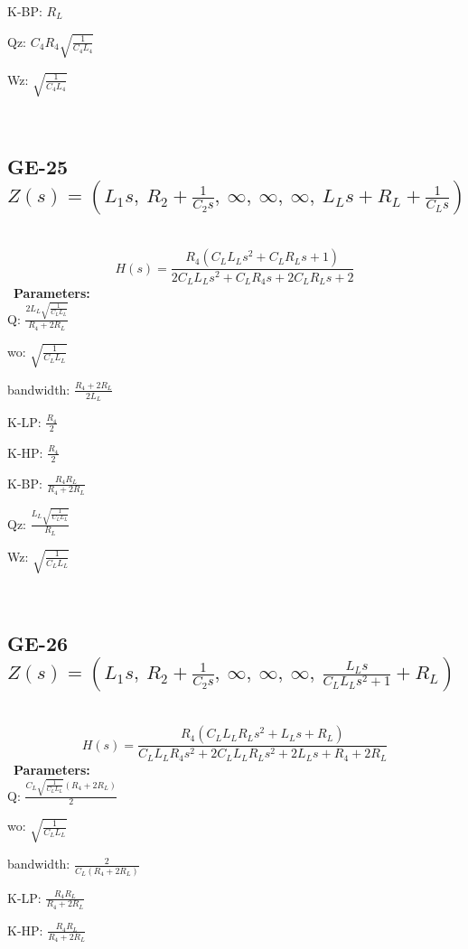 \documentclass{article}
\begin{document}
K-BP: $R_{L}$\ 

Qz: $C_{4} R_{4} \sqrt{\frac{1}{C_{4} L_{4}}}$\ 

Wz: $\sqrt{\frac{1}{C_{4} L_{4}}}$\ 

\ 

\subsection{GE-25 $Z(s) = \left( L_{1} s, \  R_{2} + \frac{1}{C_{2} s}, \  \infty, \  \infty, \  \infty, \  L_{L} s + R_{L} + \frac{1}{C_{L} s}\right)$ } \ 
\textbf{\[H(s) = \frac{R_{4} \left(C_{L} L_{L} s^{2} + C_{L} R_{L} s + 1\right)}{2 C_{L} L_{L} s^{2} + C_{L} R_{4} s + 2 C_{L} R_{L} s + 2}\] } \ 
\textbf{Parameters:}\\ 

Q: $\frac{2 L_{L} \sqrt{\frac{1}{C_{L} L_{L}}}}{R_{4} + 2 R_{L}}$\ 

wo: $\sqrt{\frac{1}{C_{L} L_{L}}}$\ 

bandwidth: $\frac{R_{4} + 2 R_{L}}{2 L_{L}}$\ 

K-LP: $\frac{R_{4}}{2}$\ 

K-HP: $\frac{R_{4}}{2}$\ 

K-BP: $\frac{R_{4} R_{L}}{R_{4} + 2 R_{L}}$\ 

Qz: $\frac{L_{L} \sqrt{\frac{1}{C_{L} L_{L}}}}{R_{L}}$\ 

Wz: $\sqrt{\frac{1}{C_{L} L_{L}}}$\ 

\ 

\subsection{GE-26 $Z(s) = \left( L_{1} s, \  R_{2} + \frac{1}{C_{2} s}, \  \infty, \  \infty, \  \infty, \  \frac{L_{L} s}{C_{L} L_{L} s^{2} + 1} + R_{L}\right)$ } \ 
\textbf{\[H(s) = \frac{R_{4} \left(C_{L} L_{L} R_{L} s^{2} + L_{L} s + R_{L}\right)}{C_{L} L_{L} R_{4} s^{2} + 2 C_{L} L_{L} R_{L} s^{2} + 2 L_{L} s + R_{4} + 2 R_{L}}\] } \ 
\textbf{Parameters:}\\ 

Q: $\frac{C_{L} \sqrt{\frac{1}{C_{L} L_{L}}} \left(R_{4} + 2 R_{L}\right)}{2}$\ 

wo: $\sqrt{\frac{1}{C_{L} L_{L}}}$\ 

bandwidth: $\frac{2}{C_{L} \left(R_{4} + 2 R_{L}\right)}$\ 

K-LP: $\frac{R_{4} R_{L}}{R_{4} + 2 R_{L}}$\ 

K-HP: $\frac{R_{4} R_{L}}{R_{4} + 2 R_{L}}$\ 
\end{document}
